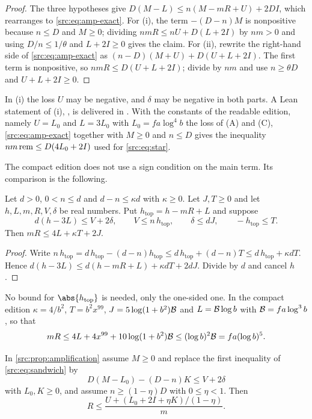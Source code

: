 \begin{proof}
The three hypotheses give $D(M-L)\le n(M-mR+U)+2DI$, which rearranges to
\eqref{src:eq:amp-exact}. For (i), the term $-(D-n)M$ is nonpositive because $n\le D$ and
$M\ge0$; dividing $nmR\le nU+D(L+2I)$ by $nm>0$ and using $D/n\le1/\theta$ and $L+2I\ge0$ gives
the claim. For (ii), rewrite the right-hand side of \eqref{src:eq:amp-exact} as
$(n-D)(M+U)+D(U+L+2I)$. The first term is nonpositive, so $nmR\le D(U+L+2I)$; divide by $nm$
and use $n\ge\theta D$ and $U+L+2I\ge0$.
\end{proof}

In (i) the loss $U$ may be negative, and $\delta$ may be negative in both parts. A Lean
statement of (i), , is delivered in
. With the constants of the
readable edition, namely $U=L_0$ and $L=3L_0$ with $L_0=fa\log^4b$ the loss of (A) and (C),
\eqref{src:eq:amp-exact} together with $M\ge0$ and $n\le D$ gives the inequality
$nm\,\mathrm{rem}\le D(4L_0+2I)$ used for \eqref{src:eq:star}.

The compact edition does not use a sign condition on the main term. Its comparison is the
following.

\begin{proposition}\label{src:prop:top}
Let $d>0$, $0<n\le d$ and $d-n\le\kappa d$ with $\kappa\ge0$. Let $J,T\ge0$ and let
$h,L,m,R,V,\delta$ be real numbers. Put $h_{\mathrm{top}}=h-mR+L$ and suppose
\[
d(h-3L)\le V+2\delta,\qquad V\le n\,h_{\mathrm{top}},\qquad \delta\le dJ,\qquad
-h_{\mathrm{top}}\le T .
\]
Then $mR\le4L+\kappa T+2J$.
\end{proposition}

\begin{proof}
Write $n\,h_{\mathrm{top}}=d\,h_{\mathrm{top}}-(d-n)h_{\mathrm{top}}\le d\,h_{\mathrm{top}}+(d-n)T
\le d\,h_{\mathrm{top}}+\kappa dT$. Hence
$d(h-3L)\le d(h-mR+L)+\kappa dT+2dJ$. Divide by $d$ and cancel $h$.
\end{proof}

No bound for $\abs{h_{\mathrm{top}}}$ is needed, only the one-sided one. In the compact
edition $\kappa=4/b^2$, $T=b^2x^{99}$, $J=5\log(1+b^2)\mathcal{B}$ and $L=\mathcal{B}\log b$ with
$\mathcal{B}=fa\log^3b$, so that
\[
mR\le4L+4x^{99}+10\log(1+b^2)\mathcal{B}\le(\log b)^2\mathcal{B}=fa(\log b)^5 .
\]

\begin{corollary}\label{src:cor:completion}
In \cref{src:prop:amplification} assume $M\ge0$ and replace the first inequality of
\eqref{src:eq:sandwich} by
\[
D(M-L_0)-(D-n)K\le V+2\delta
\]
with $L_0,K\ge0$, and assume $n\ge(1-\eta)D$ with $0\le\eta<1$. Then
\[
R\le\frac{U+(L_0+2I+\eta K)/(1-\eta)}{m} .
\]
\end{corollary}

